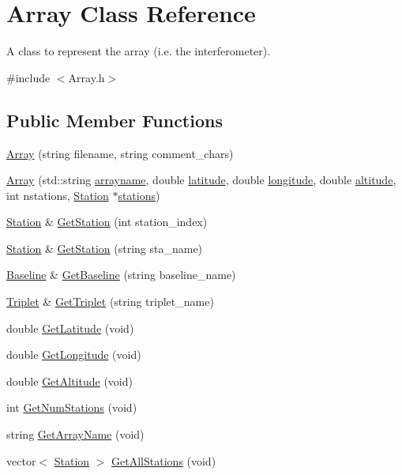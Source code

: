 \hypertarget{classArray}{
\section{Array Class Reference}
\label{classArray}
}


A class to represent the array (i.e. the interferometer).  




{\ttfamily \#include $<$Array.h$>$}

\subsection*{Public Member Functions}
\begin{DoxyCompactItemize}
\item 
\hyperlink{classArray_a4a5d472a84870d72b3d67edec898bcfa}{Array} (string filename, string comment\_\-chars)
\item 
\hyperlink{classArray_a535fa6f67112bdc50b3e3dc8fa5206a1}{Array} (std::string \hyperlink{classArray_a12eb22fefdce3d4ae71d0340717c293a}{arrayname}, double \hyperlink{classArray_a3d0a097d6c7d27ab0ba7b72a9b2223e1}{latitude}, double \hyperlink{classArray_a7b0af12d6151bd9bb25e91145b79fb74}{longitude}, double \hyperlink{classArray_a07662f84d93f59a30c9312b6b546ee39}{altitude}, int nstations, \hyperlink{classStation}{Station} $\ast$\hyperlink{classArray_a8dc3e704ff95584d28adbcedf1774b8b}{stations})
\item 
\hyperlink{classStation}{Station} \& \hyperlink{classArray_acb9ecf27c0fe2ad73e15c34f80d90c5c}{GetStation} (int station\_\-index)
\item 
\hyperlink{classStation}{Station} \& \hyperlink{classArray_a1de46f9a81f795470a6436a59e76f088}{GetStation} (string sta\_\-name)
\item 
\hyperlink{classBaseline}{Baseline} \& \hyperlink{classArray_adc65140f06b85ad9a570c4d4a80ac78c}{GetBaseline} (string baseline\_\-name)
\item 
\hyperlink{classTriplet}{Triplet} \& \hyperlink{classArray_aef1d8f21507a32f27c80768e3a465070}{GetTriplet} (string triplet\_\-name)
\item 
double \hyperlink{classArray_ab6dbcc092c509568a17875bcd9f89f2e}{GetLatitude} (void)
\item 
double \hyperlink{classArray_ab3b8cb71d4721b6f5e50a1678eab0d98}{GetLongitude} (void)
\item 
double \hyperlink{classArray_af8085a1990cb03ec60310289758a7ad0}{GetAltitude} (void)
\item 
int \hyperlink{classArray_a1c745caf02f1a9177f870c493561d891}{GetNumStations} (void)
\item 
string \hyperlink{classArray_ad881590afefd938b89b5d078d43c2548}{GetArrayName} (void)
\item 
vector$<$ \hyperlink{classStation}{Station} $>$ \hyperlink{classArray_a07428a735386518eae0bb9ce08db8c02}{GetAllStations} (void)
\end{DoxyCompactItemize}
